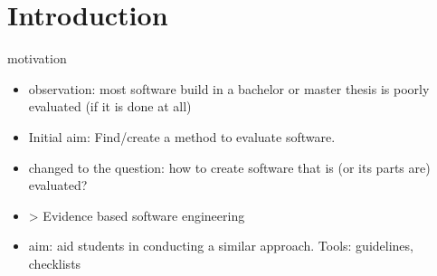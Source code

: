 \section{Introduction}

motivation

\begin{itemize}
\item observation: most software build in a bachelor or master thesis is poorly evaluated (if it is done at all)
\item Initial aim: Find/create a method to evaluate software.
\item changed to the question: how to create software that is (or its parts are) evaluated?
\item > Evidence based software engineering 
\item aim: aid students in conducting a similar approach. Tools: guidelines, checklists
\end{itemize}